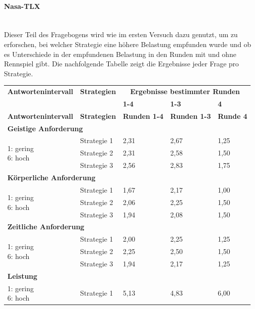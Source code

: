 \documentclass[12pt,a4paper]{scrartcl}
\begin{document}
\paragraph{Nasa-TLX}
~\\
Dieser Teil des Fragebogens wird wie im ersten Versuch dazu genutzt, um zu erforschen, bei welcher Strategie eine höhere Belastung empfunden wurde und ob es Unterschiede in der empfundenen Belastung in den Runden mit und ohne Rennspiel gibt. 
Die nachfolgende Tabelle zeigt die Ergebnisse jeder Frage pro Strategie.
\newpage
\begin{longtable}{|p{4cm}|p{2cm}|p{2cm}|p{2cm}|p{2cm}|}
	\hline
		\textbf{Antwortenintervall}&\textbf{Strategien}&\multicolumn{3}{c|}{\textbf{Ergebnisse bestimmter Runden}}\\
	&&\textbf{1-4}&\textbf{1-3} &\textbf{4}\\
	\hline
	\endfirsthead
	\hline
	\textbf{Antwortenintervall}&\textbf{Strategien}&\textbf{Runden 1-4}&\textbf{Runden 1-3} &\textbf{Runde 4}\\
	\hline
	\endhead
		\multicolumn{5}{l}{\textbf{Geistige Anforderung}}\\
		\hline
\multirow{3}{4cm}{1: gering \newline 6: hoch} & Strategie 1 &  2,31 & 2,67 & 1,25 \\
 & Strategie 2 & 2,31 & 2,58 & 1,50\\
 & Strategie 3 & 2,56 & 2,83 & 1,75 \\
\hline
		\multicolumn{5}{l}{\textbf{Körperliche Anforderung}}\\
		\hline
\multirow{3}{4cm}{1: gering \newline 6: hoch} & Strategie 1 & 1,67 & 2,17 & 1,00 \\
 & Strategie 2 & 2,06 & 2,25 & 1,50 \\
 & Strategie 3 & 1,94 & 2,08 & 1,50 \\
\hline
		\multicolumn{5}{l}{\textbf{Zeitliche Anforderung}}\\
		\hline
\multirow{3}{4cm}{1: gering \newline 6: hoch} & Strategie 1 & 2,00 & 2,25 & 1,25 \\
 & Strategie 2 & 2,25 & 2,50 & 1,50 \\
 & Strategie 3 & 1,94 & 2,17 & 1,25 \\
\hline
		\multicolumn{5}{l}{\textbf{Leistung}}\\
		\hline
\multirow{3}{4cm}{1: gering \newline 6: hoch} & Strategie 1 & 5,13 & 4,83 & 6,00 \\

\end{longtable}
\end{document}
